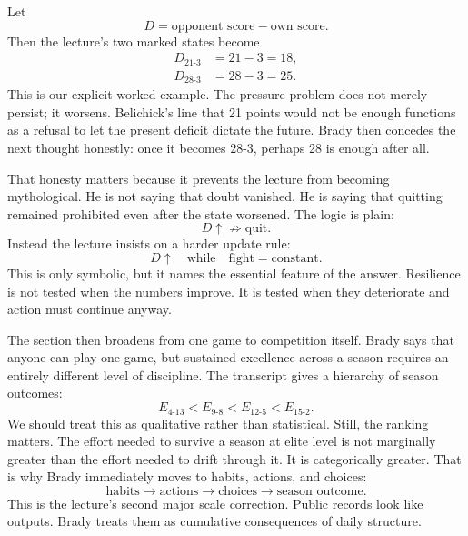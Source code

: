 Let
\begin{equation}
D = \text{opponent score} - \text{own score}.
\end{equation}
Then the lecture's two marked states become
\begin{align}
D_{21\text{-}3} &= 21-3 = 18,\\
D_{28\text{-}3} &= 28-3 = 25.
\end{align}
This is our explicit worked example. The pressure problem does not merely persist; it worsens. Belichick's line that 21 points would not be enough functions as a refusal to let the present deficit dictate the future. Brady then concedes the next thought honestly: once it becomes \(28\text{-}3\), perhaps 28 is enough after all.

That honesty matters because it prevents the lecture from becoming mythological. He is not saying that doubt vanished. He is saying that quitting remained prohibited even after the state worsened. The logic is plain:
\begin{equation}
D \uparrow
\not\Rightarrow
\text{quit}.
\end{equation}
Instead the lecture insists on a harder update rule:
\begin{equation}
D \uparrow
\quad \text{while} \quad
\text{fight} = \text{constant}.
\end{equation}
This is only symbolic, but it names the essential feature of the answer. Resilience is not tested when the numbers improve. It is tested when they deteriorate and action must continue anyway.

The section then broadens from one game to competition itself. Brady says that anyone can play one game, but sustained excellence across a season requires an entirely different level of discipline. The transcript gives a hierarchy of season outcomes:
\begin{equation}
E_{4\text{-}13} < E_{9\text{-}8} < E_{12\text{-}5} < E_{15\text{-}2}.
\end{equation}
We should treat this as qualitative rather than statistical. Still, the ranking matters. The effort needed to survive a season at elite level is not marginally greater than the effort needed to drift through it. It is categorically greater. That is why Brady immediately moves to habits, actions, and choices:
\begin{equation}
\text{habits} \to \text{actions} \to \text{choices} \to \text{season outcome}.
\end{equation}
This is the lecture's second major scale correction. Public records look like outputs. Brady treats them as cumulative consequences of daily structure.

